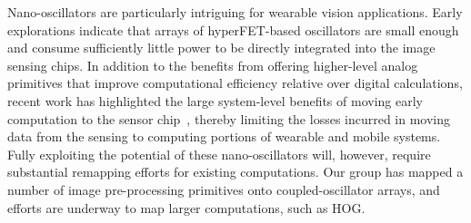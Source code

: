 Nano-oscillators are particularly intriguing for wearable vision
applications. Early explorations indicate that arrays of
hyperFET-based oscillators are small enough and consume sufficiently
little power to be directly integrated into the image sensing
chips. In addition to the benefits from offering higher-level analog
primitives that improve computational efficiency relative over digital
calculations, recent work has highlighted the large system-level
benefits of moving early computation to the sensor chip~\cite{redeye},
thereby limiting the losses incurred in moving data from the sensing
to computing portions of wearable and mobile systems. Fully exploiting
the potential of these nano-oscillators will, however, require
substantial remapping efforts for existing computations. Our group has
mapped a number of image pre-processing primitives onto
coupled-oscillator arrays, and efforts are underway to map larger
computations, such as HOG.
